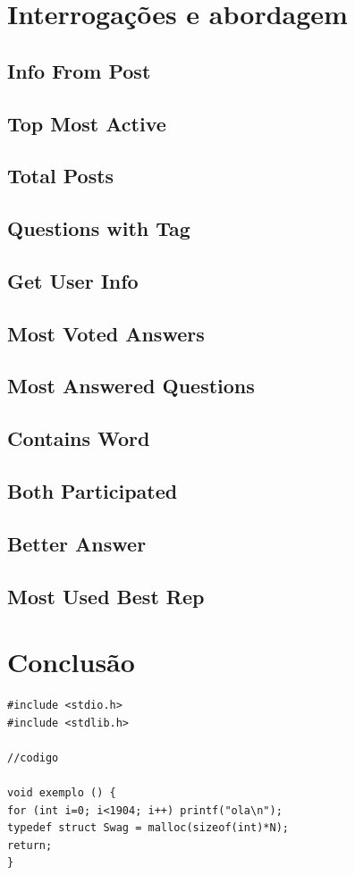 \documentclass[a4paper, 11pt, oneside]{article}
\begin{document}
\newpage
\section{Interrogações e abordagem}
\label{queries}


\subsection{Info From Post}

\subsection{Top Most Active}

\subsection{Total Posts}

\subsection{Questions with Tag}

\subsection{Get User Info}

\subsection{Most Voted Answers}

\subsection{Most Answered Questions}

\subsection{Contains Word}

\subsection{Both Participated}

\subsection{Better Answer}

\subsection{Most Used Best Rep}

\newpage
\section{Conclusão}

\begin{lstlisting}[caption= exemplo código]
#include <stdio.h>
#include <stdlib.h>

//codigo

void exemplo () {
for (int i=0; i<1904; i++) printf("ola\n");
typedef struct Swag = malloc(sizeof(int)*N);
return;
}
\end{lstlisting}
\end{document}
